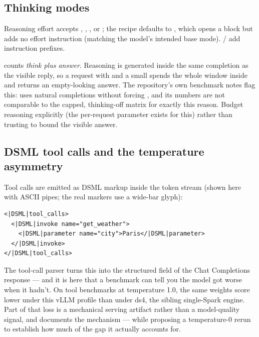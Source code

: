 \subsection{Thinking modes}

Reasoning effort accepts , , , or ;
the recipe defaults  to , which opens a
 block but adds no effort instruction (matching the model's
intended base mode). / add instruction prefixes.

\begin{hbwarning}
 counts \emph{think plus answer}. Reasoning is generated
inside the same completion as the visible reply, so a request with
 and a small  spends the whole
window inside  and returns an empty-looking answer. The repository's
own benchmark notes flag this:  uses
natural completions without forcing , and its numbers are
not comparable to the capped, thinking-off matrix for exactly this reason.
Budget reasoning explicitly (the per-request 
parameter exists for this) rather than trusting  to bound the
visible answer.
\end{hbwarning}

\subsection{DSML tool calls and the temperature asymmetry}

Tool calls are emitted as DSML markup inside the token stream (shown here with
ASCII pipes; the real markers use a wide-bar glyph):

\begin{lstlisting}
<|DSML|tool_calls>
  <|DSML|invoke name="get_weather">
    <|DSML|parameter name="city">Paris</|DSML|parameter>
  </|DSML|invoke>
</|DSML|tool_calls>
\end{lstlisting}

The  tool-call parser turns this into the structured
 field of the Chat Completions response --- and it is here
that a benchmark can tell you the model got worse when it hadn't. On tool
benchmarks at temperature 1.0, the same weights score lower under this vLLM
profile than under ds4, the sibling single-Spark engine. Part of that loss is
a mechanical serving artifact rather than a model-quality signal, and
 documents the mechanism ---
while proposing a temperature-0 rerun to establish how much of the gap it
actually accounts for.

